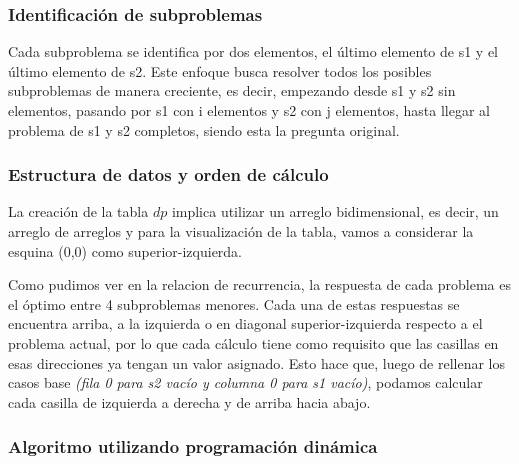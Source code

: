 \subsubsection{Identificación de subproblemas}
Cada subproblema se identifica por dos elementos, el último elemento de s1 y el último elemento de s2. Este enfoque busca resolver todos los posibles subproblemas 
de manera creciente, es decir, empezando desde s1 y s2 sin elementos, pasando por s1 con i elementos y s2 con j elementos, hasta llegar al problema de s1 y s2 completos, 
siendo esta la pregunta original.
\subsubsection{Estructura de datos y orden de cálculo}
La creación de la tabla $dp$ implica utilizar un arreglo bidimensional, es decir, un arreglo de arreglos y para la visualización de la tabla, vamos a considerar la esquina (0,0) como superior-izquierda. 

Como pudimos ver en la relacion de recurrencia, la respuesta de cada problema es el óptimo entre 4 subproblemas menores. 
Cada una de estas respuestas se encuentra arriba, a la izquierda o en diagonal superior-izquierda respecto a el problema actual, por lo que cada cálculo tiene como requisito que las casillas en esas direcciones ya tengan un valor asignado. Esto hace que, luego de rellenar los casos 
base \textit{(fila 0 para s2 vacío y columna 0 para s1 vacío)}, podamos calcular cada casilla de izquierda a derecha y de arriba hacia abajo.
\subsubsection{Algoritmo utilizando programación dinámica}



